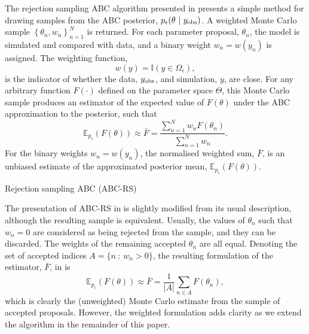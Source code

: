 \documentclass[review,demo]{siamonline190516}
\begin{document}
The rejection sampling ABC algorithm presented in  presents a simple method for drawing samples from the ABC posterior, $p_\epsilon(\theta~|~y_{\mathrm{obs}})$.
A weighted Monte Carlo sample $\left\{ \theta_n, w_n \right\}_{n=1}^N$ is returned.
For each parameter proposal, $\theta_n$, the model is simulated and compared with data, and a binary weight $w_n = w(y_n)$ is assigned. 
The weighting function,
\[
 w(y) = \mathbb I(y \in \Omega_\epsilon),
\]
is the indicator of whether the data, $y_{\mathrm{obs}}$, and simulation, $y$, are close.
For any arbitrary function $F(\cdot)$ defined on the parameter space $\Theta$, this Monte Carlo sample produces an estimator of the expected value of $F(\theta)$ under the ABC approximation to the posterior, such that
\begin{equation}
 \label{eq:estimate}
 \mathbb E_{p_\epsilon}(F(\theta)) \approx \bar F = \frac{\sum_{n=1}^N w_n F(\theta_n)}{\sum_{n=1}^N w_n}.
\end{equation}
For the binary weights $w_n = w(y_n)$, the normalised weighted sum, $\bar F$, is an unbiased estimate of the approximated posterior mean, $\mathbb E_{p_\epsilon}(F(\theta))$.

\begin{algorithm}
\caption{Rejection sampling ABC (ABC-RS)}
\label{ABC:Rejection}
\begin{algorithmic}[1]
\REPEAT{}
\end{algorithmic}
\end{algorithm}

The presentation of ABC-RS in  is slightly modified from its usual description, although the resulting sample is equivalent.
Usually, the values of $\theta_n$ such that $w_n=0$ are considered as being rejected from the sample, and they can be discarded.
The weights of the remaining accepted $\theta_n$ are all equal.
Denoting the set of accepted indices $A = \{ n~:~w_n>0 \}$,
the resulting formulation of the estimator, $\bar F$, in  is 
\[
 \mathbb E_{p_\epsilon}(F(\theta)) \approx \bar F = \frac{1}{|A|} \sum_{n \in A} F(\theta_n),
\]
which is clearly the (unweighted) Monte Carlo estimate from the sample of accepted proposals.
However, the weighted formulation adds clarity as we extend the algorithm in the remainder of this paper.
\end{document}
